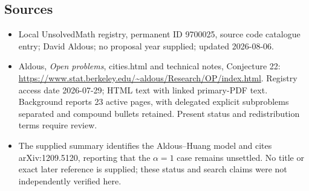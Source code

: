 \documentclass[11pt]{article}
\begin{document}
\subsection{Sources}
\begin{itemize}
\item Local UnsolvedMath registry, permanent ID 9700025, source code catalogue entry; David Aldous; no proposal year supplied; updated 2026-08-06.
\item Aldous, \emph{Open problems}, cities.html and technical notes, Conjecture 22: \url{https://www.stat.berkeley.edu/~aldous/Research/OP/index.html}. Registry access date 2026-07-29; HTML text with linked primary-PDF text. Background reports 23 active pages, with delegated explicit subproblems separated and compound bullets retained. Present status and redistribution terms require review.
\item The supplied summary identifies the Aldous--Huang model and cites arXiv:1209.5120, reporting that the \(\alpha=1\) case remains unsettled. No title or exact later reference is supplied; these status and search claims were not independently verified here.
\end{itemize}
\end{document}
